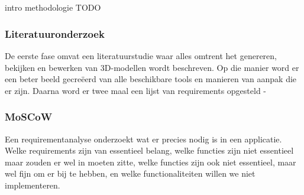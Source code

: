 
\chapter{}%
\label{ch:methodologie}

intro methodologie TODO
\subsection{Literatuuronderzoek}
 De eerste fase omvat een literatuurstudie waar alles omtrent het genereren, bekijken en bewerken van 3D-modellen wordt beschreven. Op die manier word er een beter beeld gecreëerd van alle beschikbare tools en manieren van aanpak die er zijn. Daarna word er twee maal een lijst van requirements opgesteld 
-

\subsection{MoSCoW}
Een requirementanalyse onderzoekt wat er precies nodig is in een applicatie. Welke requirements zijn van essentieel belang, welke functies zijn niet essentieel maar zouden er wel in moeten zitte, welke functies zijn ook niet essentieel, maar wel fijn om er bij te hebben, en welke functionaliteiten willen we niet implementeren. 

